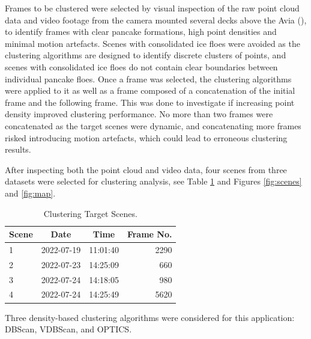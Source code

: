 Frames to be clustered were selected by visual inspection of the raw point cloud data and video footage from the camera mounted several decks above the Avia (\cite{passerottiSCALEWIN22SAAgulhas,passerottiSCALEWIN22SAAgulhasa,passerottiSCALEWIN22SAAgulhasb}), to identify frames with clear pancake formations, high point densities and minimal motion artefacts. Scenes with consolidated ice floes were avoided as the clustering algorithms are designed to identify discrete clusters of points, and scenes with consolidated ice floes do not contain clear boundaries between individual pancake floes. Once a frame was selected, the clustering algorithms were applied to it as well as a frame composed of a concatenation of the initial frame and the following frame. This was done to investigate if increasing point density improved clustering performance. No more than two frames were concatenated as the target scenes were dynamic, and concatenating more frames risked introducing motion artefacts, which could lead to erroneous clustering results.

After inspecting both the point cloud and video data, four scenes from three datasets were selected for clustering analysis, see Table \ref{tab:clust_scene} and Figures \ref{fig:scenes} and \ref{fig:map}.

\begin{table}[H]
\centering
\caption{Clustering Target Scenes.}
\begin{tabular}{|l|r|r|r|}
\hline
\multicolumn{1}{|c|}{\textbf{Scene}} & \multicolumn{1}{c|}{\textbf{Date}} & \multicolumn{1}{c|}{\textbf{Time}} & \multicolumn{1}{c|}{\textbf{Frame No.}} \\ \hline
1 & 2022-07-19 & 11:01:40 & 2290 \\ \hline
2 & 2022-07-23 & 14:25:09 & 660  \\ \hline
3 & 2022-07-24 & 14:18:05 & 980  \\ \hline
4 & 2022-07-24 & 14:25:49 & 5620 \\ \hline
\end{tabular}
\label{tab:clust_scene}
\end{table}

Three density-based clustering algorithms were considered for this application: \ac{DBScan}, \ac{VDBScan}, and \ac{OPTICS}.

